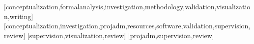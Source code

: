 \documentclass[spanish]{textolivre}
\begin{document}
\begin{contributors}
[conceptualization,formalanalysis,investigation,methodology,validation,visualization,writing]
[conceptualization,investigation,projadm,resources,software,validation,supervision,review]
[supervision,visualization,review]
[projadm,supervision,review]
\end{contributors}
\end{document}
